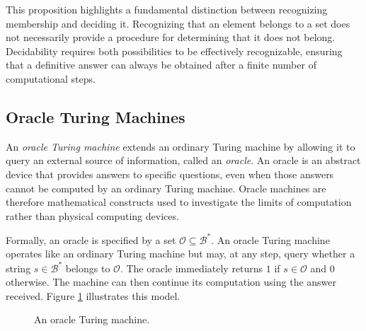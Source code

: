This proposition highlights a fundamental distinction between recognizing membership and deciding it. Recognizing that an element belongs to a set does not necessarily provide a procedure for determining that it does not belong. Decidability requires both possibilities to be effectively recognizable, ensuring that a definitive answer can always be obtained after a finite number of computational steps.


\subsection*{Oracle Turing Machines}

An \emph{oracle Turing machine} extends an ordinary Turing machine by allowing it to query an external source of information, called an \emph{oracle}. An oracle is an abstract device that provides answers to specific questions, even when those answers cannot be computed by an ordinary Turing machine. Oracle machines are therefore mathematical constructs used to investigate the limits of computation rather than physical computing devices.

Formally, an oracle is specified by a set $\mathcal{O}\subseteq\mathcal{B}^\ast$. An oracle Turing machine operates like an ordinary Turing machine but may, at any step, query whether a string $s\in\mathcal{B}^\ast$ belongs to $\mathcal{O}$. The oracle immediately returns $1$ if $s\in\mathcal{O}$ and $0$ otherwise. The machine can then continue its computation using the answer received. Figure \ref{fig:Oracle-Turing-Machine} illustrates this model.

\begin{figure}[t]
\centering
{}
\caption{\label{fig:Oracle-Turing-Machine}An oracle Turing machine.}
\end{figure}

